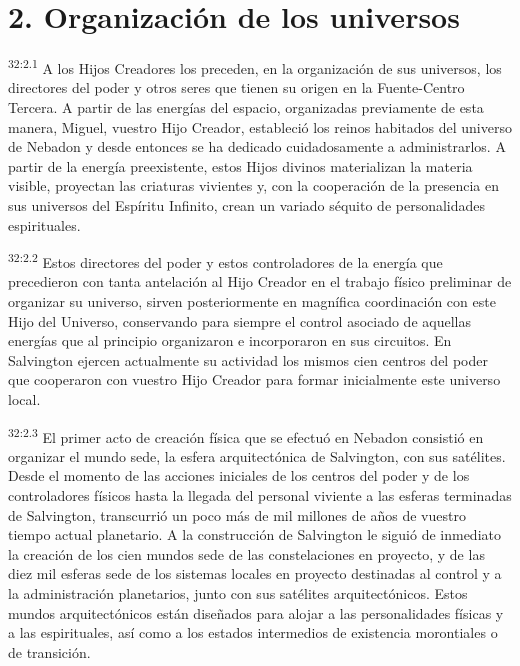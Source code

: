 \section*{2. Organización de los universos}
\par
\textsuperscript{32:2.1} A los Hijos Creadores los preceden, en la organización de sus universos, los directores del poder y otros seres que tienen su origen en la Fuente-Centro Tercera. A partir de las energías del espacio, organizadas previamente de esta manera, Miguel, vuestro Hijo Creador, estableció los reinos habitados del universo de Nebadon y desde entonces se ha dedicado cuidadosamente a administrarlos. A partir de la energía preexistente, estos Hijos divinos materializan la materia visible, proyectan las criaturas vivientes y, con la cooperación de la presencia en sus universos del Espíritu Infinito, crean un variado séquito de personalidades espirituales.

\par
\textsuperscript{32:2.2} Estos directores del poder y estos controladores de la energía que precedieron con tanta antelación al Hijo Creador en el trabajo físico preliminar de organizar su universo, sirven posteriormente en magnífica coordinación con este Hijo del Universo, conservando para siempre el control asociado de aquellas energías que al principio organizaron e incorporaron en sus circuitos. En Salvington ejercen actualmente su actividad los mismos cien centros del poder que cooperaron con vuestro Hijo Creador para formar inicialmente este universo local.

\par
\textsuperscript{32:2.3} El primer acto de creación física que se efectuó en Nebadon consistió en organizar el mundo sede, la esfera arquitectónica de Salvington, con sus satélites. Desde el momento de las acciones iniciales de los centros del poder y de los controladores físicos hasta la llegada del personal viviente a las esferas terminadas de Salvington, transcurrió un poco más de mil millones de años de vuestro tiempo actual planetario. A la construcción de Salvington le siguió de inmediato la creación de los cien mundos sede de las constelaciones en proyecto, y de las diez mil esferas sede de los sistemas locales en proyecto destinadas al control y a la administración planetarios, junto con sus satélites arquitectónicos. Estos mundos arquitectónicos están diseñados para alojar a las personalidades físicas y a las espirituales, así como a los estados intermedios de existencia morontiales o de transición.

